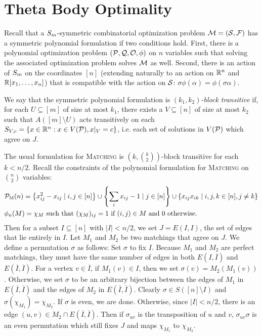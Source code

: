 \section{Theta Body Optimality}\label{sec:thetabodyoptimality}
Recall that a $S_{m}$-symmetric combinatorial optimization problem $\mathcal M = (\mathcal S, \mathcal F)$ has a symmetric polynomial formulation if two conditions hold. First, there is a polynomial optimization problem $(\mathcal P, \mathcal Q, \mathcal O, \phi)$ on $n$ variables such that solving the associated optimization problem solves $\mathcal M$ as well. Second, there is an action of $S_{m}$ on the coordinates $[n]$ (extending naturally to an action on $\mathbb R^n$ and $\mathbb R[x_1,\dots,x_n]$) that is compatible with the action on $\mathcal S$: $\sigma\phi(\alpha) = \phi(\sigma \alpha)$. 
\begin{definition}
We say that the symmetric polynomial formulation is \emph{$(k_1,k_2)$-block transitive} if, for each $U \subseteq [m]$ of size at most $k_1$, there exists a $V \subseteq [n]$ of size at most $k_2$ such that $A([m] \setminus U)$ acts transitively on each $S_{V,c} = \{x \in \mathbb R^n: x \in V(\mathcal P), x|_V = c\}$, i.e. each set of solutions in $V(\mathcal P)$ which agree on $J$.
\end{definition}
\begin{example}\label{ex:matching-blocktransitive}
The usual formulation for \textsc{Matching} is $\left(k,\binom{k}{2}\right)$-block transitive for each $k < n/2$. Recall the constraints of the polynomial formulation for \textsc{Matching} on $\binom{n}{2}$ variables:
\begin{align*}
&\mathcal P_{\textsc{M}}(n) = \left\{x_{ij}^2 - x_{ij} \mid i,j \in [n]\right\} \cup \left\{\sum_i x_{ij} - 1 \mid j \in [n]\right\} \cup \left\{x_{ij}x_{ik} \mid i,j,k \in [n], j\neq k\right\} \\
&\phi_n(M) = \chi_M \text{ such that } (\chi_M)_{ij} = 1 \text{ if $(i,j) \in M$ and $0$ otherwise.}
\end{align*}
Then for a subset $I \subseteq [n]$ with $|I| < n/2$, we set $J = E(I,I)$, the set of edges that lie entirely in $I$. Let $M_1$ and $M_2$ be two matchings that agree on $J$. We define a permutation $\sigma$ as follows: Set $\sigma$ to fix $I$. Because $M_1$ and $M_2$ are perfect matchings, they must have the same number of edges in both $E(I, \overline{I})$ and $E(\overline{I},\overline{I})$. For a vertex $v \in \overline{I}$, if $M_1(v) \in I$, then we set $\sigma(v) = M_2(M_1(v))$. Otherwise, we set $\sigma$ to be an arbitrary bijection between the edges of $M_1$ in $E(\overline{I},\overline{I})$ and the edges of $M_2$ in $E(\overline{I},\overline{I})$. Clearly $\sigma \in S([n]\setminus I)$ and $\sigma(\chi_{M_1}) = \chi_{M_2}$. If $\sigma$ is even, we are done. Otherwise, since $|I| < n/2$, there is an edge $(u,v) \in M_2 \cap E(\overline{I},\overline{I})$. Then if $\sigma_{uv}$ is the transposition of $u$ and $v$, $\sigma_{uv}\sigma$ is an even permutation which still fixes $J$ and maps $\chi_{M_1}$ to $\chi_{M_2}$.
\end{example}

